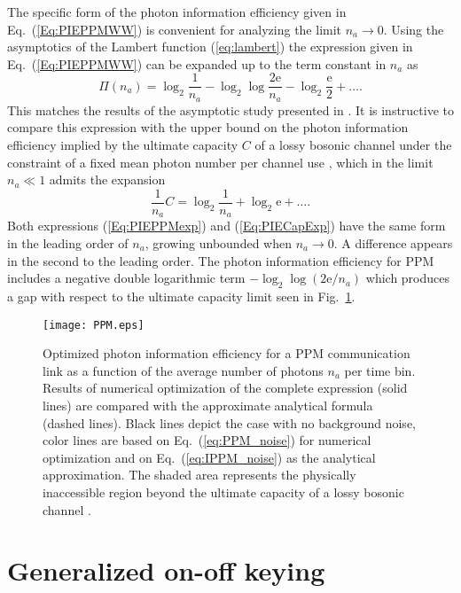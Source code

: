 \documentclass[conference]{IEEEtran}
\newcommand{\Eul}{\mathrm{e}}
\begin{document}
The specific form of the photon information efficiency given in Eq.~(\ref{Eq:PIEPPMWW}) is convenient for analyzing the limit $n_a \rightarrow 0$. Using the asymptotics of the Lambert function (\ref{eq:lambert}) the expression given in Eq.~(\ref{Eq:PIEPPMWW}) can be expanded up to the  term constant in $n_a$ as
\begin{equation}
\Pi (n_{a}) = \log_2 \frac{1}{n_{a}} -  \log_2 \log \frac{2\Eul}{n_{a}} -\log_2 \frac{\Eul}{2} + \ldots.
\label{Eq:PIEPPMexp}
\end{equation}
This matches the results of the asymptotic study presented in \cite{Wang2014}.
It is instructive to compare this expression with the upper bound on the photon information efficiency implied by the ultimate capacity $C$ of a lossy bosonic channel under the constraint of a fixed mean photon number per channel use \cite{Giovannetti2004}, which in the limit $n_a \ll 1$ admits the expansion
\begin{equation}
\frac{1}{n_{a}}C  = \log_2 \frac{1}{n_{a}} + \log_2 \Eul + \ldots.
\label{Eq:PIECapExp}
\end{equation}
Both expressions (\ref{Eq:PIEPPMexp}) and (\ref{Eq:PIECapExp}) have the same form in the leading order of $n_a$, growing unbounded when $n_a \rightarrow 0$. A difference appears in the second to the leading order. The photon information efficiency for PPM includes a negative double logarithmic term $-\log_2\log({2\Eul}/{n_a})$ which produces a gap with respect to the ultimate capacity limit seen in Fig.~\ref{fig:PPM}.

\begin{figure}
\texttt{[image: PPM.eps]}
\caption{Optimized photon information efficiency for a PPM communication link as a function of the average number of photons $n_a$ per time bin. Results of numerical optimization of the complete expression (solid lines) are compared with the approximate analytical formula (dashed lines). Black lines depict the case with no background noise, color lines are based on Eq.~(\ref{eq:PPM_noise}) for numerical optimization and on Eq.~(\ref{eq:IPPM_noise}) as the analytical approximation.
The shaded area represents the physically inaccessible region beyond the ultimate capacity of a lossy bosonic channel \cite{Giovannetti2004}.}
\label{fig:PPM}
\end{figure}

\section{Generalized on-off keying}
\label{Sec:GOOK}
\end{document}

